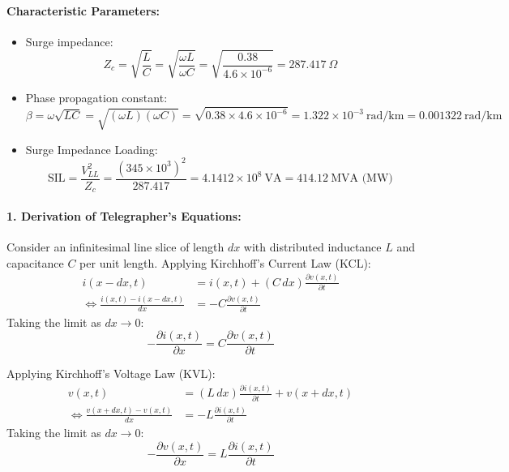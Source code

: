 \paragraph{Characteristic Parameters:}
\begin{itemize}
    \item Surge impedance:
    \begin{equation}
        Z_c = \sqrt{\frac{L}{C}} = \sqrt{\frac{\omega L}{\omega C}} = \sqrt{\frac{0.38}{4.6 \times 10^{-6}}} = 287.417\ \Omega
    \end{equation}
    \item Phase propagation constant:
    \begin{equation}
        \beta = \omega \sqrt{LC} = \sqrt{(\omega L)(\omega C)} = \sqrt{0.38 \times 4.6 \times 10^{-6}} = 1.322 \times 10^{-3}\ \text{rad/km} = 0.001322\ \text{rad/km}
    \end{equation}
    \item Surge Impedance Loading:
    \begin{equation}
        \text{SIL} = \frac{V_{LL}^2}{Z_c} = \frac{(345 \times 10^3)^2}{287.417} = 4.1412 \times 10^8\ \text{VA} = 414.12\ \text{MVA (MW)}
    \end{equation}
\end{itemize}

\paragraph{1. Derivation of Telegrapher's Equations:}
Consider an infinitesimal line slice of length $dx$ with distributed inductance $L$ and capacitance $C$ per unit length.
Applying Kirchhoff's Current Law (KCL):
\begin{align}
    i(x - dx, t) &= i(x, t) + (C\,dx) \frac{\partial v(x, t)}{\partial t} \nonumber\\
    \iff \frac{i(x, t) - i(x - dx, t)}{dx} &= - C \frac{\partial v(x, t)}{\partial t}
\end{align}
Taking the limit as $dx \to 0$:
\begin{equation}
    -\frac{\partial i(x, t)}{\partial x} = C \frac{\partial v(x, t)}{\partial t} \label{eq:kcl_telegraph}
\end{equation}

Applying Kirchhoff's Voltage Law (KVL):
\begin{align}
    v(x, t) &= (L\,dx) \frac{\partial i(x, t)}{\partial t} + v(x + dx, t) \nonumber\\
    \iff \frac{v(x + dx, t) - v(x, t)}{dx} &= - L \frac{\partial i(x, t)}{\partial t}
\end{align}
Taking the limit as $dx \to 0$:
\begin{equation}
    -\frac{\partial v(x, t)}{\partial x} = L \frac{\partial i(x, t)}{\partial t} \label{eq:kvl_telegraph}
\end{equation}

